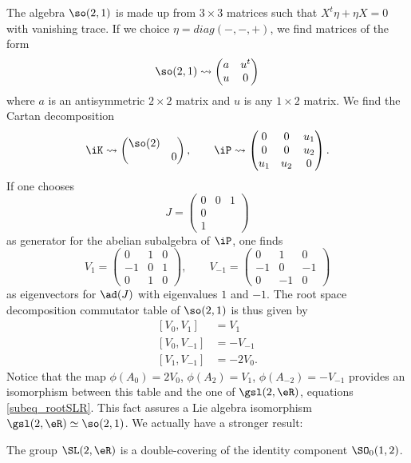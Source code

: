 The algebra $\so(2,1)$ is made up from $3\times 3$ matrices such that $X^t\eta+\eta X=0$ with vanishing trace. If we choice $\eta=diag(-,-,+)$, we find matrices of the form
\[ 
  \so(2,1)\leadsto\begin{pmatrix}
a	&u^t\\
u	&0
\end{pmatrix}
\]
where $a$ is an antisymmetric $2\times 2$ matrix and $u$ is any $1\times 2$ matrix. We find the Cartan decomposition
\[ 
  \iK\leadsto\begin{pmatrix}
\so(2)\\&0
\end{pmatrix},\qquad
\iP\leadsto\begin{pmatrix}
0&0&u_1\\
0&0&u_2\\
u_1&u_2&0
\end{pmatrix}.
\]
If one chooses
\[ 
  J=\begin{pmatrix}
0&0&1\\0\\1
\end{pmatrix}
\]
as generator for the abelian subalgebra of $\iP$, one finds
\[ 
	V_1=
	\begin{pmatrix}
		0&1&0\\
		-1&0&1\\
		0&1&0
	\end{pmatrix},\qquad
	V_{-1}=
	\begin{pmatrix}
		0&1&0\\
		-1&0&-1\\
		0&-1&0
	\end{pmatrix}
\]
as eigenvectors for $\ad(J)$ with eigenvalues $1$ and $-1$. The root space decomposition commutator table of $\so(2,1)$ is thus given by
\begin{subequations}
	\begin{align}
		 [V_0,V_1]&=V_1\\
		[V_0,V_{-1}]&=-V_{-1}\\
		[V_1,V_{-1}]&=-2V_0.
	\end{align}
\end{subequations}
Notice that the map $\phi(A_0)=2V_0$, $\phi(A_2)=V_1$, $\phi(A_{-2})=-V_{-1}$ provides an isomorphism between this table and the one of $\gsl(2,\eR)$, equations \eqref{subeq_rootSLR}. This fact assures a Lie algebra isomorphism $\gsl(2,\eR)\simeq\so(2,1)$. We actually have a stronger result: 

\begin{proposition}
The group $\SL(2,\eR)$ is a double-covering of the identity component $\SO_0(1,2)$.
\end{proposition}

